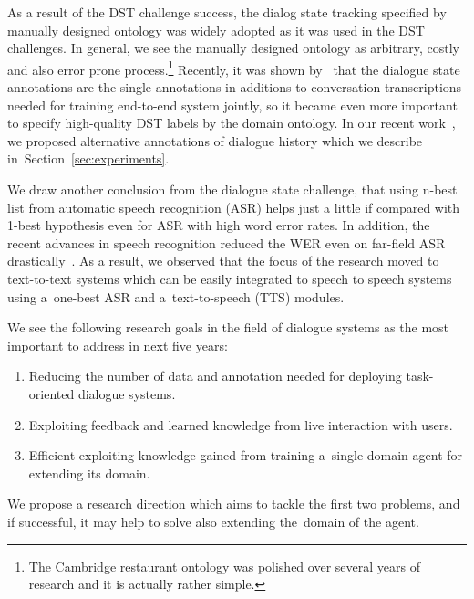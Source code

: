 \documentclass[11pt]{article}
\begin{document}
As a result of the DST challenge success, the dialog state tracking specified by manually designed ontology was widely adopted as it was used in the DST challenges.
In general, we see the manually designed ontology as arbitrary, costly and also error prone process.\footnote{The Cambridge restaurant ontology was polished over several years of research and it is actually rather simple.}
Recently, it was shown by~\cite{wen_networkbased_2016} that the dialogue state annotations are the single annotations in additions to conversation transcriptions needed for training end-to-end system jointly, so it became even more important to specify high-quality DST labels by the domain ontology.
In our recent work~\cite{platek2016wochat}, we proposed alternative annotations of dialogue history which we describe in~Section~\ref{sec:experiments}.

We draw another conclusion from the dialogue state challenge, that using n-best list from automatic speech recognition (ASR) helps just a little if compared with 1-best hypothesis even for ASR with high word error rates.
In addition, the recent advances in speech recognition reduced the WER even on far-field ASR drastically~\cite{peddinti_jhu_2015,zhang_highway_2016}.
As a result, we observed that the focus of the research moved to text-to-text systems which can be easily integrated to speech to speech systems using a~one-best ASR and a~text-to-speech (TTS) modules.

We see the following research goals in the field of dialogue systems as the most important to address in next five years:
\begin{enumerate}
    \item Reducing the number of data and annotation needed for deploying task-oriented dialogue systems.
    \item Exploiting feedback and learned knowledge from live interaction with users.
    \item Efficient exploiting knowledge gained from training a~single domain agent for extending its domain. 
\end{enumerate}


We propose a research direction which aims to tackle the first two problems, and if successful, it may help to solve also extending the~domain of the agent.
\end{document}
